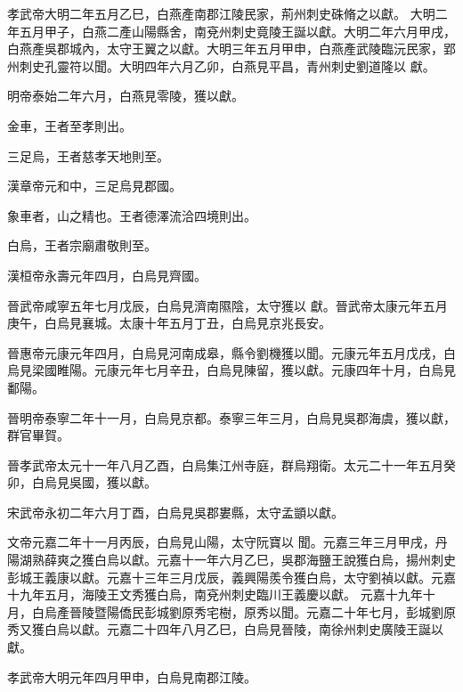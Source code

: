 \begin{pinyinscope}
 孝武帝大明二年五月乙巳，白燕產南郡江陵民家，荊州刺史硃脩之以獻。
 大明二年五月甲子，白燕二產山陽縣舍，南兗州刺史竟陵王誕以獻。大明二年六月甲戌，白燕產吳郡城內，太守王翼之以獻。大明三年五月甲申，白燕產武陵臨沅民家，郢州刺史孔靈符以聞。大明四年六月乙卯，白燕見平昌，青州刺史劉道隆以
 獻。



 明帝泰始二年六月，白燕見零陵，獲以獻。


金車，王者至孝則出。



 三足烏，王者慈孝天地則至。



 漢章帝元和中，三足烏見郡國。


象車者，山之精也。王者德澤流洽四境則出。



 白烏，王者宗廟肅敬則至。



 漢桓帝永壽元年四月，白烏見齊國。



 晉武帝咸寧五年七月戊辰，白烏見濟南隰陰，太守獲以
 獻。晉武帝太康元年五月庚午，白烏見襄城。太康十年五月丁丑，白烏見京兆長安。



 晉惠帝元康元年四月，白烏見河南成皋，縣令劉機獲以聞。元康元年五月戊戌，白烏見梁國睢陽。元康元年七月辛丑，白烏見陳留，獲以獻。元康四年十月，白烏見鄱陽。



 晉明帝泰寧二年十一月，白烏見京都。泰寧三年三月，白烏見吳郡海虞，獲以獻，群官畢賀。



 晉孝武帝太元十一年八月乙酉，白烏集江州寺庭，群烏翔衛。太元二十一年五月癸卯，白烏見吳國，獲以獻。



 宋武帝永初二年六月丁酉，白烏見吳郡婁縣，太守孟顗以獻。



 文帝元嘉二年十一月丙辰，白烏見山陽，太守阮寶以
 聞。元嘉三年三月甲戌，丹陽湖熟薛爽之獲白烏以獻。元嘉十一年六月乙巳，吳郡海鹽王說獲白烏，揚州刺史彭城王義康以獻。元嘉十三年三月戊辰，義興陽羨令獲白烏，太守劉禎以獻。元嘉十九年五月，海陵王文秀獲白烏，南兗州刺史臨川王義慶以獻。
 元嘉十九年十月，白烏產晉陵暨陽僑民彭城劉原秀宅樹，原秀以聞。元嘉二十年七月，彭城劉原秀又獲白烏以獻。元嘉二十四年八月乙巳，白烏見晉陵，南徐州刺史廣陵王誕以獻。



 孝武帝大明元年四月甲申，白烏見南郡江陵。




\end{pinyinscope}
